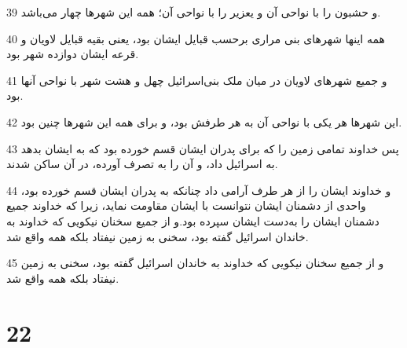 \par 39 و حشبون را با نواحی آن و یعزیر را با نواحی آن؛ همه این شهرها چهار می‌باشد.
\par 40 همه اینها شهرهای بنی مراری برحسب قبایل ایشان بود، یعنی بقیه قبایل لاویان و قرعه ایشان دوازده شهر بود.
\par 41 و جمیع شهرهای لاویان در میان ملک بنی‌اسرائیل چهل و هشت شهر با نواحی آنها بود.
\par 42 این شهرها هر یکی با نواحی آن به هر طرفش بود، و برای همه این شهرها چنین بود.
\par 43 پس خداوند تمامی زمین را که برای پدران ایشان قسم خورده بود که به ایشان بدهد به اسرائیل داد، و آن را به تصرف آورده، در آن ساکن شدند.
\par 44 و خداوند ایشان را از هر طرف آرامی داد چنانکه به پدران ایشان قسم خورده بود، واحدی از دشمنان ایشان نتوانست با ایشان مقاومت نماید، زیرا که خداوند جمیع دشمنان ایشان را به‌دست ایشان سپرده بود.و از جمیع سخنان نیکویی که خداوند به خاندان اسرائیل گفته بود، سخنی به زمین نیفتاد بلکه همه واقع شد.
\par 45 و از جمیع سخنان نیکویی که خداوند به خاندان اسرائیل گفته بود، سخنی به زمین نیفتاد بلکه همه واقع شد.
 
\chapter{22}

